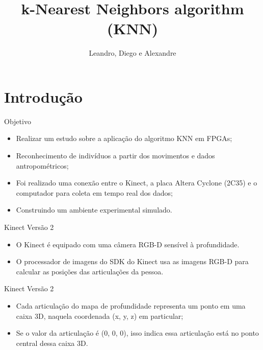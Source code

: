 \documentclass[11pt]{beamer}
\author{Leandro, Diego e Alexandre}
\title{k-Nearest Neighbors algorithm (KNN)}
\begin{document}
\begin{frame}
\titlepage
\end{frame}

\begin{frame}
\tableofcontents
\end{frame}

\section{Introdução}
\begin{frame}{Objetivo}
	\begin{itemize}
	\item Realizar um estudo sobre a aplicação do algoritmo KNN em FPGAs;
	\item Reconhecimento de indivíduos a partir dos movimentos e dados
	antropométricos;
	\item Foi realizado uma conexão entre o Kinect, a placa Altera Cyclone
	(2C35) e o computador para coleta em tempo real dos dados;
	\item Construindo um ambiente experimental simulado. 
	\end{itemize}
\end{frame}

\begin{frame}{Kinect Versão 2}

\begin{itemize}
	\item O Kinect é equipado com uma câmera RGB-D sensível à profundidade.
	\item O processador de imagens do SDK do Kinect usa as imagens RGB-D para
	calcular as posições das articulações da pessoa.
\end{itemize}

\end{frame}

\begin{frame}{Kinect Versão 2}

\begin{itemize}
	\item Cada articulação do mapa de profundidade representa um ponto em uma
	caixa 3D, naquela coordenada (x, y, z) em particular;
	\item Se o valor da articulação é (0, 0, 0), isso indica essa articulação
	está no ponto central dessa caixa 3D.
\end{itemize}

\end{frame}
\end{document}

